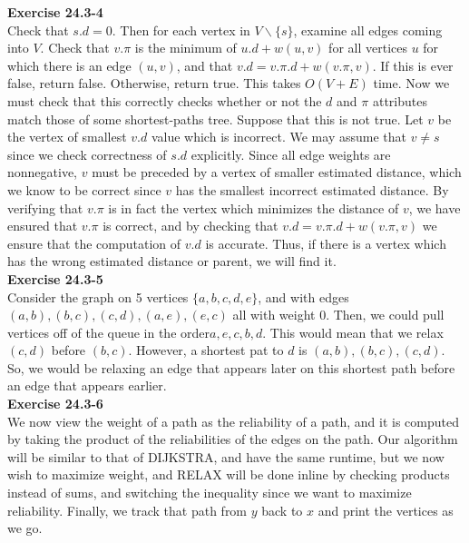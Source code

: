 \documentclass{article}
\begin{document}
\noindent\textbf{Exercise 24.3-4}\\

Check that $s.d = 0$.  Then for each vertex in $V\backslash \{s\}$, examine all edges coming into $V$.   Check that $v.\pi$ is the minimum of $u.d + w(u,v)$ for all vertices $u$ for which there is an edge $(u,v)$, and that $v.d = v.\pi.d + w(v.\pi, v)$.  If this is ever false, return false.  Otherwise, return true.  This takes $O(V+E)$ time.  Now we must check that this correctly checks whether or not the $d$ and $\pi$ attributes match those of some shortest-paths tree.  Suppose that this is not true.  Let $v$ be the vertex of smallest $v.d$ value which is incorrect.  We may assume that $v \neq s$ since we check correctness of $s.d$ explicitly.  Since all edge weights are nonnegative, $v$ must be preceded by a vertex of smaller estimated distance, which we know to be correct since $v$ has the smallest incorrect estimated distance. By verifying that $v.\pi$ is in fact the vertex which minimizes the distance of $v$, we have ensured that $v.\pi$ is correct, and by checking that $v.d = v.\pi.d + w(v.\pi, v)$ we ensure that the computation of $v.d$ is accurate.  Thus, if there is a vertex which has the wrong estimated distance or parent, we will find it. \\

\noindent\textbf{Exercise 24.3-5}\\

Consider the graph on 5 vertices $\{a,b,c,d,e\}$, and with edges $(a,b),(b,c),(c,d),(a,e),(e,c)$ all with weight 0. Then, we could pull vertices off of the queue in the order$a,e,c,b,d$. This would mean that we relax $(c,d)$ before $(b,c)$. However, a shortest pat to $d$ is $(a,b),(b,c),(c,d)$. So, we would be relaxing an edge that appears later on this shortest path before an edge that appears earlier.\\

\noindent\textbf{Exercise 24.3-6}\\

We now view the weight of a path as the reliability of a path, and it is computed by taking the product of the reliabilities of the edges on the path. Our algorithm will be similar to that of DIJKSTRA, and have the same runtime, but we now wish to maximize weight, and RELAX will be done inline by checking products instead of sums, and switching the inequality since we want to maximize reliability.  Finally, we track that path from $y$ back to $x$ and print the vertices as we go. \\
\end{document}
